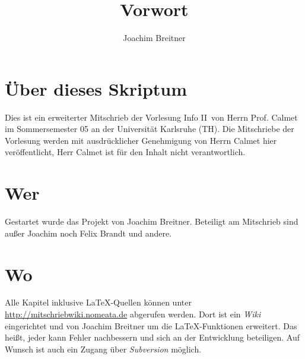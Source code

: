 \documentclass{article}
\title{Vorwort}
\author{Joachim Breitner}
\begin{document}
\maketitle

\section{Über dieses Skriptum}
Dies ist ein erweiterter Mitschrieb der Vorlesung \glqq Info II\grqq\ von Herrn Prof. Calmet im
Sommersemester 05 an der Universität Karlsruhe (TH).
Die Mitschriebe der Vorlesung werden mit ausdrücklicher Genehmigung von Herrn Calmet hier veröffentlicht,
Herr Calmet ist für den Inhalt nicht verantwortlich.

\section{Wer}
Gestartet wurde das Projekt von Joachim Breitner. Beteiligt am Mitschrieb sind außer Joachim noch Felix Brandt und andere.

\section{Wo}
Alle Kapitel inklusive \LaTeX-Quellen können unter \url{http://mitschriebwiki.nomeata.de} abgerufen werden.
Dort ist ein \emph{Wiki} eingerichtet und von Joachim Breitner um die \LaTeX-Funktionen erweitert.
Das heißt, jeder kann Fehler nachbessern und sich an der Entwicklung
beteiligen. Auf Wunsch ist auch ein Zugang über \emph{Subversion} möglich.
\end{document}
